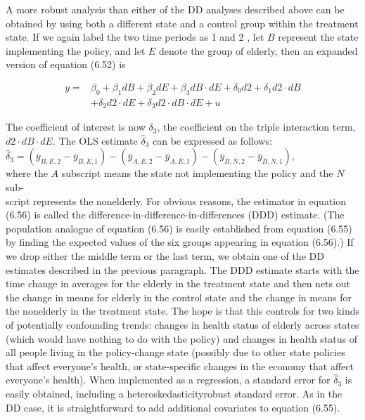 \documentclass[10pt]{article}
\begin{document}
A more robust analysis than either of the DD analyses described above can be obtained by using both a different state and a control group within the treatment state. If we again label the two time periods as 1 and 2 , let $B$ represent the state implementing the policy, and let $E$ denote the group of elderly, then an expanded version of equation (6.52) is


\begin{align*}
y= & \beta_{0}+\beta_{1} d B+\beta_{2} d E+\beta_{3} d B \cdot d E+\delta_{0} d 2+\delta_{1} d 2 \cdot d B \\
& +\delta_{2} d 2 \cdot d E+\delta_{3} d 2 \cdot d B \cdot d E+u \tag{6.55}
\end{align*}


The coefficient of interest is now $\delta_{3}$, the coefficient on the triple interaction term, $d 2 \cdot d B \cdot d E$. The OLS estimate $\hat{\delta}_{3}$ can be expressed as follows:\\
$\hat{\delta}_{3}=\left(\bar{y}_{B, E, 2}-\bar{y}_{B, E, 1}\right)-\left(\bar{y}_{A, E, 2}-\bar{y}_{A, E, 1}\right)-\left(\bar{y}_{B, N, 2}-\bar{y}_{B, N, 1}\right)$,\\
where the $A$ subscript means the state not implementing the policy and the $N$ sub-\\
script represents the nonelderly. For obvious reasons, the estimator in equation (6.56) is called the difference-in-difference-in-differences (DDD) estimate. (The population analogue of equation (6.56) is easily established from equation (6.55) by finding the expected values of the six groups appearing in equation (6.56).) If we drop either the middle term or the last term, we obtain one of the DD estimates described in the previous paragraph. The DDD estimate starts with the time change in averages for the elderly in the treatment state and then nets out the change in means for elderly in the control state and the change in means for the nonelderly in the treatment state. The hope is that this controls for two kinds of potentially confounding trends: changes in health status of elderly across states (which would have nothing to do with the policy) and changes in health status of all people living in the policy-change state (possibly due to other state policies that affect everyone's health, or state-specific changes in the economy that affect everyone's health). When implemented as a regression, a standard error for $\hat{\delta}_{3}$ is easily obtained, including a heteroskedasticityrobust standard error. As in the DD case, it is straightforward to add additional covariates to equation (6.55).
\end{document}
